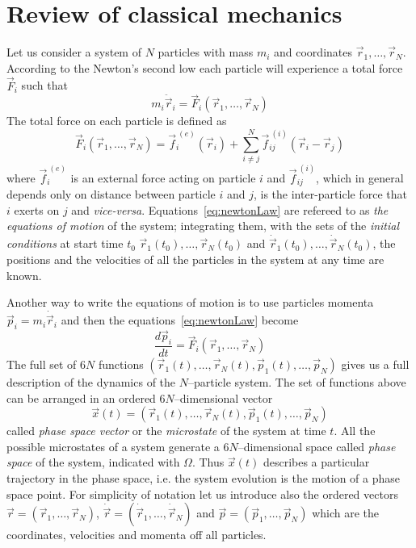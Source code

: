 \section{Review of classical mechanics}
Let us consider a system of $N$ particles with mass $m_i$ and coordinates $\vec r_1,\dots,\vec r_N$. According 
to the Newton's second low each particle will experience a total force $\vec F_i$ such that
\begin{equation}
	m_i \ddot{\vec{r}}_i = \vec F_i(\vec r_1,\dots,\vec r_N)
	\label{eq:newtonLaw}
\end{equation}
The total force on each particle is defined as
\begin{equation*}
	\vec F_i(\vec r_1,\dots,\vec r_N) = \vec{f}_i^{\ (e)}(\vec r_i) + \sum_{i\ne j}^N \vec{f}_{ij}^{\ (i)}(\vec r_i - \vec r_j )
\end{equation*}
where $\vec{f}_i^{\ (e)}$ is an external force acting on particle $i$ and $\vec{f}_{ij}^{\ (i)}$, which in general
depends only on distance between particle $i$ and $j$, is the inter-particle force that $i$ exerts on $j$ and
\textit{vice-versa}. Equations~\eqref{eq:newtonLaw} are refereed to as \textit{the equations of motion} of the
system; integrating them, with the sets of the \textit{initial conditions} at start time 
$t_0$ $\vec r_1(t_0),\dots,\vec r_N(t_0)$ and $\dot{\vec{r}}_1(t_0),\dots,\dot{\vec{r}}_N(t_0)$, the positions 
and the velocities of all the particles in the system at any time are known.

Another way to write the equations of motion is to use particles momenta $\vec p_i = m_i \dot{\vec{r}}_i$ and then
the equations~\eqref{eq:newtonLaw} become
\begin{equation}
	\frac{d\vec p_i}{dt} = \vec F_i(\vec r_1,\dots,\vec r_N)
	\label{eq:newtonLawMom}
\end{equation}
The full set of $6N$ functions $(\vec r_1(t),\dots,\vec r_N(t),\vec p_1(t),\dots,\vec p_N)$ gives us a full
description of the dynamics of the $N$--particle system. The set of functions above can be arranged in an ordered 
$6N$--dimensional vector
\begin{equation}
	\vec x(t) = (\vec r_1(t),\dots,\vec r_N(t),\vec p_1(t),\dots,\vec p_N)
	\label{eq:phSpaceVector}
\end{equation}
called \textit{phase space vector} or the \textit{microstate} of the system at time $t$. All the possible
microstates of a system generate a $6N$--dimensional space called \textit{phase space} of the system, indicated 
with $\Omega$. Thus $\vec x(t)$ describes a particular trajectory in the phase space, i.e. the system evolution 
is the motion of a phase space point. For simplicity of notation let us introduce also the ordered vectors 
$\vec r = (\vec r_1, \dots, \vec r_N)$, $\dot{\vec r} = (\dot{\vec{r}}_1,\dots,\dot{\vec{r}}_N)$ and 
$\vec p = (\vec p_1, \dots, \vec p_N)$ which are the coordinates, velocities and momenta off all particles.

